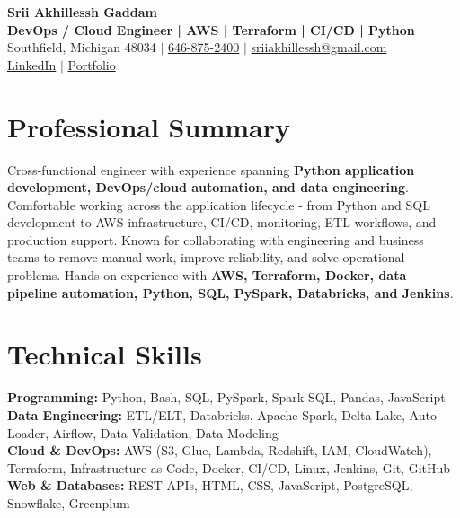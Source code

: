 \documentclass[letterpaper,10pt]{article}
\begin{document}
\fontsize{9.35pt}{10.45pt}\selectfont

\begin{center}
    {\LARGE \textbf{Srii Akhillessh Gaddam}} \\[-1pt]
    \textbf{DevOps / Cloud Engineer | AWS | Terraform | CI/CD | Python} \\[2pt]
    Southfield, Michigan 48034 $|$
    \href{tel:6468752400}{646-875-2400} $|$
    \href{mailto:sriiakhillessh@gmail.com}{sriiakhillessh@gmail.com} \\[1pt]
    \href{https://www.linkedin.com/in/srii-akhiilessh-gaddam-b48668191/}{LinkedIn} $|$
    \href{https://sriiakhillesshg.github.io/portfolio/}{Portfolio}
\end{center}
\vspace{-8pt}

\section{Professional Summary}
\small{Cross-functional engineer with experience spanning \textbf{Python application development, DevOps/cloud automation, and data engineering}. Comfortable working across the application lifecycle - from Python and SQL development to AWS infrastructure, CI/CD, monitoring, ETL workflows, and production support. Known for collaborating with engineering and business teams to remove manual work, improve reliability, and solve operational problems. Hands-on experience with \textbf{AWS, Terraform, Docker, data pipeline automation, Python, SQL, PySpark, Databricks, and Jenkins}.}

\section{Technical Skills}
\small{
\textbf{Programming:} Python, Bash, SQL, PySpark, Spark SQL, Pandas, JavaScript \\
\textbf{Data Engineering:} ETL/ELT, Databricks, Apache Spark, Delta Lake, Auto Loader, Airflow, Data Validation, Data Modeling \\
\textbf{Cloud \& DevOps:} AWS (S3, Glue, Lambda, Redshift, IAM, CloudWatch), Terraform, Infrastructure as Code, Docker, CI/CD, Linux, Jenkins, Git, GitHub \\
\textbf{Web \& Databases:} REST APIs, HTML, CSS, JavaScript, PostgreSQL, Snowflake, Greenplum
}
\end{document}
